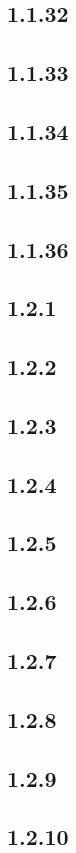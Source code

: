 \documentclass[11pt]{article}
\begin{document}
	\subsection*{1.1.32}
	\subsection*{1.1.33}
	\subsection*{1.1.34}
	\subsection*{1.1.35}
	\subsection*{1.1.36}
	\subsection*{1.2.1}
	\subsection*{1.2.2}
	\subsection*{1.2.3}
	\subsection*{1.2.4}
	\subsection*{1.2.5}
	\subsection*{1.2.6}
	\subsection*{1.2.7}
	\subsection*{1.2.8}
	\subsection*{1.2.9}
	\subsection*{1.2.10}
\end{document}
